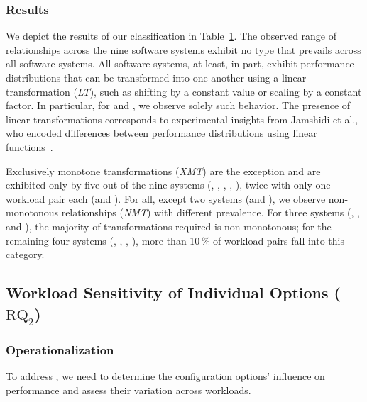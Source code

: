 {{\begin{table}
\begin{tabular}{p{1.1cm}rrrrrrr}
	\bottomrule
	\end{tabular}
	\label{tab:categorization_counts}
\end{table}

\subsubsection{Results}
{\color{black}
We depict the results of our classification in Table~\ref{tab:categorization_counts}. The observed range of relationships across the nine software systems exhibit no type that prevails across all software systems. 
All software systems, at least, in part, exhibit performance distributions that can be transformed into one another using a linear transformation (\textit{\colorbox{lt-color}{LT}}), such as shifting by a constant value or scaling by a constant factor. In particular, for \jumper and \xzwo, we observe solely such behavior. The presence of linear transformations corresponds to experimental insights from Jamshidi et al., who encoded differences between performance distributions using linear functions~\cite{jamishidi_transfer_2017}.

Exclusively monotone transformations (\textit{\colorbox{xmt-color}{XMT}}) are the exception and are exhibited only by five out of the nine systems (\kanzi, \batik, \xz, \lrzip, \zdrei), twice with only one workload pair each (\xz and \zdrei).  
For all, except two systems (\jumper and \xzwo), we observe non-monotonous relationships (\textit{\colorbox{nmt-color}{NMT}}) with different prevalence.  For three systems (\dconvert, \htwo, and \zdrei), the majority of transformations required is non-monotonous; for the remaining four systems (\kanzi, \batik, \xz, \lrzip), more than 10\,\% of workload pairs fall into this category.

\vspace{1mm}

\subsection{Workload Sensitivity of Individual Options ($\text{RQ}_\text{2}$)}\label{sec:rq2}

\subsubsection{Operationalization}
To address , we need to determine the configuration options’ influence on performance and assess their variation across workloads. 

}}}
